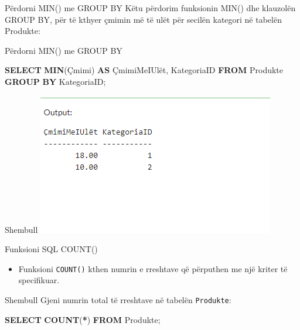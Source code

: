 \documentclass[
  ignorenonframetext,
]{beamer}
\newenvironment{Shaded}{\begin{snugshade}}{\end{snugshade}}
\newcommand{\FunctionTok}[1]{\textcolor[rgb]{0.13,0.29,0.53}{\textbf{#1}}}
\newcommand{\KeywordTok}[1]{\textcolor[rgb]{0.13,0.29,0.53}{\textbf{#1}}}
\newcommand{\NormalTok}[1]{#1}
\newcommand{\OperatorTok}[1]{\textcolor[rgb]{0.81,0.36,0.00}{\textbf{#1}}}
\providecommand{\tightlist}{%
  \setlength{\itemsep}{0pt}\setlength{\parskip}{0pt}}
\begin{document}
\begin{frame}{Përdorni MIN() me GROUP BY}
\label{puxebrdorni-min-me-group-by}
Këtu përdorim funksionin MIN() dhe klauzolën GROUP BY, për të kthyer
çmimin më të ulët për secilën kategori në tabelën Produkte:
\end{frame}

\begin{frame}[fragile]{Përdorni MIN() me GROUP BY}
\label{puxebrdorni-min-me-group-by-1}

\begin{Shaded}
\begin{Highlighting}[]
\KeywordTok{SELECT} \FunctionTok{MIN}\NormalTok{(Çmimi) }\KeywordTok{AS}\NormalTok{ ÇmimiMeIUlët, KategoriaID}
\KeywordTok{FROM}\NormalTok{ Produkte}
\KeywordTok{GROUP} \KeywordTok{BY}\NormalTok{ KategoriaID;}
\end{Highlighting}
\end{Shaded}
\end{frame}

\begin{frame}{Shembull}
\label{shembull-21}
\includegraphics{./Figs/query45.png}
\end{frame}

\begin{frame}[fragile]{Funksioni SQL COUNT()}
\label{funksioni-sql-count}
\begin{itemize}
\tightlist
\item
  Funksioni \texttt{COUNT()} kthen numrin e rreshtave që përputhen me
  një kriter të specifikuar.
\end{itemize}
\end{frame}

\begin{frame}[fragile]{Shembull}
\label{shembull-22}
Gjeni numrin total të rreshtave në tabelën \texttt{Produkte}:


\begin{Shaded}
\begin{Highlighting}[]
\KeywordTok{SELECT} \FunctionTok{COUNT}\NormalTok{(}\OperatorTok{*}\NormalTok{)}
\KeywordTok{FROM}\NormalTok{ Produkte;}
\end{Highlighting}
\end{Shaded}
\end{frame}
\end{document}
